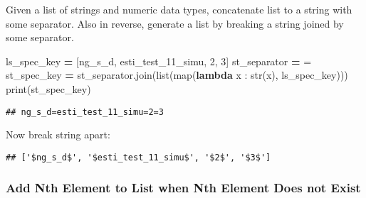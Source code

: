 \documentclass[
]{book}
\newenvironment{Shaded}{\begin{snugshade}}{\end{snugshade}}
\newcommand{\BuiltInTok}[1]{#1}
\newcommand{\DecValTok}[1]{\textcolor[rgb]{0.00,0.00,0.81}{#1}}
\newcommand{\KeywordTok}[1]{\textcolor[rgb]{0.13,0.29,0.53}{\textbf{#1}}}
\newcommand{\NormalTok}[1]{#1}
\newcommand{\OperatorTok}[1]{\textcolor[rgb]{0.81,0.36,0.00}{\textbf{#1}}}
\newcommand{\StringTok}[1]{\textcolor[rgb]{0.31,0.60,0.02}{#1}}
\begin{document}
Given a list of strings and numeric data types, concatenate list to a string with some separator. Also in reverse, generate a list by breaking a string joined by some separator.

\begin{Shaded}
\begin{Highlighting}[]
\NormalTok{ls\_spec\_key }\OperatorTok{=}\NormalTok{ [}\StringTok{\textquotesingle{}ng\_s\_d\textquotesingle{}}\NormalTok{, }\StringTok{\textquotesingle{}esti\_test\_11\_simu\textquotesingle{}}\NormalTok{, }\DecValTok{2}\NormalTok{, }\DecValTok{3}\NormalTok{]}
\NormalTok{st\_separator }\OperatorTok{=} \StringTok{\textquotesingle{}=\textquotesingle{}}
\NormalTok{st\_spec\_key }\OperatorTok{=}\NormalTok{ st\_separator.join(}\BuiltInTok{list}\NormalTok{(}\BuiltInTok{map}\NormalTok{(}\KeywordTok{lambda}\NormalTok{ x : }\BuiltInTok{str}\NormalTok{(x), ls\_spec\_key)))}
\BuiltInTok{print}\NormalTok{(st\_spec\_key)}
\end{Highlighting}
\end{Shaded}

\begin{verbatim}
## ng_s_d=esti_test_11_simu=2=3
\end{verbatim}

Now break string apart:

\begin{Shaded}
\end{Shaded}

\begin{verbatim}
## ['$ng_s_d$', '$esti_test_11_simu$', '$2$', '$3$']
\end{verbatim}

\hypertarget{add-nth-element-to-list-when-nth-element-does-not-exist}{%
\subsubsection{Add Nth Element to List when Nth Element Does not Exist}\label{add-nth-element-to-list-when-nth-element-does-not-exist}}
\end{document}
